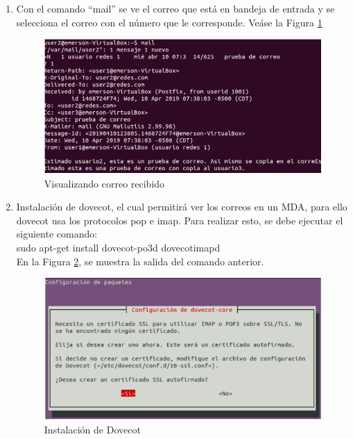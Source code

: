 \begin{enumerate}
    \item Con el comando “mail” se ve el correo que está en bandeja de entrada y se selecciona el correo con el número que le corresponde. Veáse la Figura \ref{fig:smtp11}
    
    \begin{figure}[H]
        \centering
        \includegraphics[scale=.75]{imagenes/primero/paso11_smtp.PNG}
        \caption{Visualizando correo recibido}
        \label{fig:smtp11}
    \end{figure}
    
    \item Instalación de dovecot, el cual permitirá ver los correos en un MDA, para ello dovecot usa los protocolos pop e imap. Para realizar esto, se debe ejecutar el siguiente comando:\\
    
    sudo apt-get install dovecot-po3d dovecotimapd\\
    
    \noindent
    En la Figura \ref{fig:smtp12}, se muestra la salida del comando anterior.
    
    \begin{figure}[H]
        \centering
        \includegraphics[scale=.95]{imagenes/primero/paso12_smtp.PNG}
        \caption{Instalación de Dovecot}
        \label{fig:smtp12}
    \end{figure}
    

\end{enumerate}
